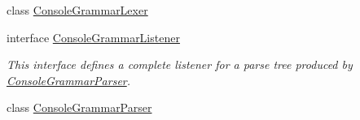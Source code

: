 \begin{DoxyCompactItemize}
class \hyperlink{classgov_1_1nasa_1_1jpf_1_1inspector_1_1client_1_1parser_1_1_console_grammar_lexer}{Console\+Grammar\+Lexer}
\item 
interface \hyperlink{interfacegov_1_1nasa_1_1jpf_1_1inspector_1_1client_1_1parser_1_1_console_grammar_listener}{Console\+Grammar\+Listener}
\begin{DoxyCompactList}\small\item\em This interface defines a complete listener for a parse tree produced by \hyperlink{classgov_1_1nasa_1_1jpf_1_1inspector_1_1client_1_1parser_1_1_console_grammar_parser}{Console\+Grammar\+Parser}. \end{DoxyCompactList}\item 
class \hyperlink{classgov_1_1nasa_1_1jpf_1_1inspector_1_1client_1_1parser_1_1_console_grammar_parser}{Console\+Grammar\+Parser}
\end{DoxyCompactItemize}
